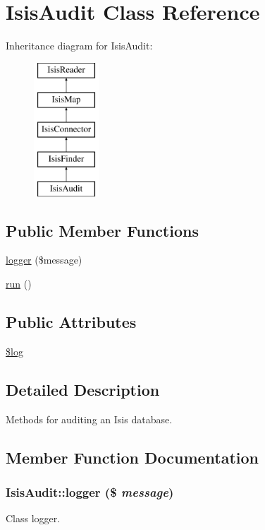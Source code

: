 \hypertarget{classIsisAudit}{
\section{IsisAudit Class Reference}
\label{classIsisAudit}
}
Inheritance diagram for IsisAudit:\begin{figure}[H]
\begin{center}
\leavevmode
\includegraphics[height=5cm]{classIsisAudit}
\end{center}
\end{figure}
\subsection*{Public Member Functions}
\begin{DoxyCompactItemize}
\item 
\hyperlink{classIsisAudit_add19ca3adcb5646d7d1d6906593cd4ab}{logger} (\$message)
\item 
\hyperlink{classIsisAudit_a2fb1d5a12933f63f396188bc4229f671}{run} ()
\end{DoxyCompactItemize}
\subsection*{Public Attributes}
\begin{DoxyCompactItemize}
\item 
\hyperlink{classIsisAudit_ab4bb04f3deedf206358a2cedfe3c2294}{\$log}
\end{DoxyCompactItemize}


\subsection{Detailed Description}
Methods for auditing an Isis database. 

\subsection{Member Function Documentation}
\hypertarget{classIsisAudit_add19ca3adcb5646d7d1d6906593cd4ab}{
\subsubsection[{logger}]{\setlength{\rightskip}{0pt plus 5cm}IsisAudit::logger (\$ {\em message})}}
\label{classIsisAudit_add19ca3adcb5646d7d1d6906593cd4ab}
Class logger.


